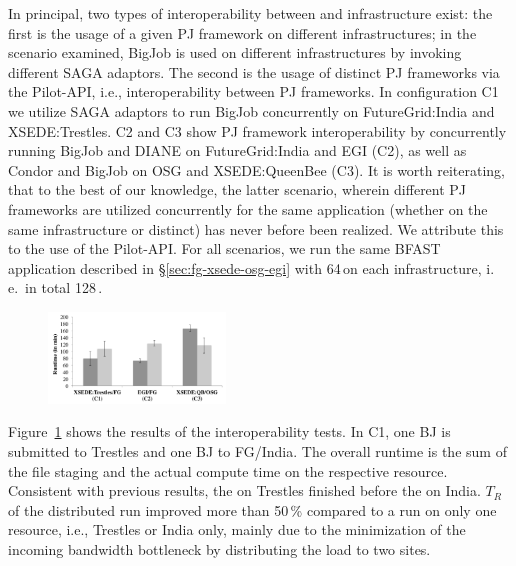 \documentclass[conference]{IEEEtran}
\begin{document}
In principal, two types of interoperability between \pilotjobs and
infrastructure exist: the first is the usage of a given PJ framework
on different infrastructures; in the scenario examined, BigJob is used
on different infrastructures by invoking different SAGA adaptors.  The
second is the usage of distinct PJ frameworks via the Pilot-API, i.e.,
interoperability between PJ frameworks. In configuration C1 we utilize
SAGA adaptors to run BigJob concurrently on FutureGrid:India and
XSEDE:Trestles. C2 and C3 show PJ framework interoperability by
concurrently running BigJob and DIANE on FutureGrid:India and EGI
(C2), as well as Condor and BigJob on OSG and XSEDE:QueenBee (C3). It
is worth reiterating, that to the best of our knowledge, the latter
scenario, wherein different PJ frameworks are utilized concurrently
for the same application (whether on the same infrastructure or
distinct) has never before been realized. We attribute this to the use
of the Pilot-API.  For all scenarios, we run the same BFAST
application described in \S\ref{sec:fg-xsede-osg-egi} with 64\,\cus on
each infrastructure, i.\,e.\ in total 128\,\cus.

\begin{figure}[t]
 \up\up
  	\centering
	\includegraphics[width=0.42\textwidth]{../perf/interop/128-bfast-interop-with-staging.pdf}
	\caption{}
	\label{fig:perf_interop_128-bfast-interop}
\end{figure}



Figure~\ref{fig:perf_interop_128-bfast-interop} shows the results of
the interoperability tests. In C1, one BJ \pilot is submitted to
Trestles and one BJ \pilot to FG/India.  The overall runtime is the
sum of the file staging and the actual compute time on the respective
resource. Consistent with previous results, the \pilot on Trestles
finished before the \pilot on India. $T_R$ of the distributed run
improved more than 50\,\% compared to a run on only one resource,
i.e., Trestles or India only, mainly due to the minimization of the
incoming bandwidth bottleneck by distributing the load to two sites.
\end{document}
